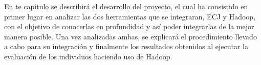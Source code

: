 En te capitulo se describir\'a el desarrollo del proyecto, el cual ha consistido en primer lugar en analizar las dos herramientas que se integraran, ECJ y Hadoop, con el objetivo de conocerlas en profundidad y as\'i poder integrarlas de la mejor manera posible. Una vez analizadas ambas, se explicar\'a el procedimiento llevado a cabo para su integración y finalmente los resultados obtenidos al ejecutar la evaluación de los individuos haciendo uso de Hadoop.